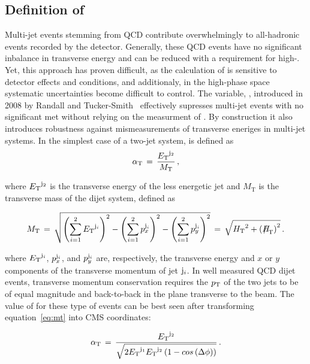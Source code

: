 \clearpage
\subsection{Definition of \texorpdfstring{\alphat}{AlphaT}\label{sec:alphat}}

Multi-jet events stemming from QCD contribute overwhelmingly to
all-hadronic events recorded by the detector. Generally, these QCD events
have no significant inbalance in transverse energy and can 
be reduced with a requirement for high-\met. Yet, this approach has proven difficult, 
as the calculation of \met is sensitive to detector effects and conditions, 
and additionaly, in the high-\met phase space systematic uncertainties become difficult
to control. The variable, \alphat, introduced in 2008 by Randall and 
Tucker-Smith~\cite{Randall:2008rw} effectively supresses multi-jet 
events with no significant met without relying on the measurment
of \met. By construction it also introduces robustness against mismeasurements 
of transverse eneriges in multi-jet systems.  In the simplest case of a two-jet system,
\alphat is defined as
\begin{equation}
\label{eq:alphat}
\alpha_{\text{T}}\, =\, \frac{{E_{\text T}}^{{\rm j}_2}}{M_\text{T}} \, ,
\end{equation}

where ${E_{\text T}}^{\rm j_2}$ is the transverse energy of the less energetic
jet and $M_\text{T}$ is the transverse mass of the dijet system,
defined as

\begin{equation}
  \label{eq:mt}
  M_\text{T}\, = \,\sqrt{ \left( \sum_{i=1}^2 \Et^{{\rm j}_i}
    \right)^2 - \left( \sum_{i=1}^2 p_x^{{\rm j}_i} \right)^2 - \left(
      \sum_{i=1}^2 p_y^{{\rm j}_i} \right)^2} \, = \,\sqrt{\scalht^2 + \left(\mht\right)^2} \,  .
\end{equation}

where ${E_{\text T}}^{{\rm j}_i}$, $p_x^{{\rm j}_i}$, and $p_y^{{\rm j}_i}$ are,
respectively, the transverse energy and $x$ or $y$ components of the
transverse momentum of jet ${\rm j}_i$. In well measured QCD dijet events, 
transverse momentum conservation requires the $p_{\mathrm{T}}$ of the two jets to be 
of equal magnitude and back-to-back in the plane transverse to the beam.
The value of \alphat for these type of events can be best seen
after transforming equation~\ref{eq:mt} into CMS coordinates:

\begin{equation}
  \label{eq:mt-polar}
  \alpha_{\text{T}}\, = \,\frac{{E_{\text T}}^{{\rm j}_2}}{\sqrt{2{E_{\text T}}^{{\rm j}_1}
   {E_{\text T}}^{{\rm j}_2} \left(1-cos\left(\Delta\phi\right)\right)}}\, .
\end{equation}

